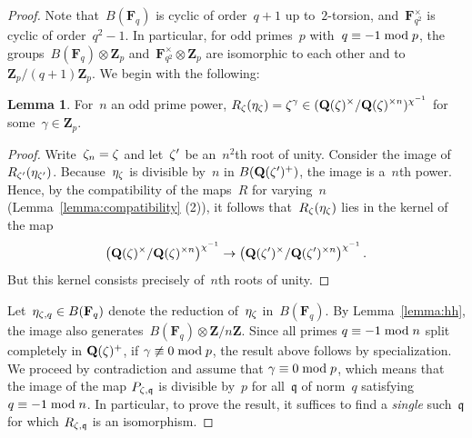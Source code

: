 \documentclass[12pt,reqno]{amsart}
\theoremstyle{definition}
\newtheorem{lemma}[theorem]{Lemma}
\newcommand{\changed}[1]{{#1}}
\def\mod{\;\text{\rm mod}\;}
\def\Q{\mathbf Q}   %
\def\Z{\mathbf Z}   %
\def\F{\mathbf F}   %
\def\ii{i}
\def\red{\color{red}}
\def\nn{n}
\def\q{\mathfrak{q}}
\begin{document}
\begin{proof} 
Note that~$B(\F_q)$ is cyclic of order~$q+1$ up to~$2$-torsion,
and~$\F^{\times}_{q^2}$ is cyclic of order~$q^2 -1$. In particular, 
for odd primes~$p$ with~$q \equiv -1 \mod p$, the 
groups~$B(\F_q) \otimes \Z_p$ and~$ \F^{\times}_{q^2} \otimes \Z_p$ are 
isomorphic to each other and to~$\Z_p/(q+1)\Z_p$.
We begin with the following:
 
\begin{lemma} \label{invertible} \changed{For~$\nn$ an odd prime power}, 
$\displaystyle{R_\z(\eta_\z) 
= \z^\gamma \in (\Q(\z)^{\times}/\Q(\z)^{\times \nn})^{\chi^{-1}}}$
for some~$\gamma \in \Z_p$. 
\end{lemma}
 
\begin{proof} 
Write~$\z_{\nn} = \z$ and let~$\zeta'$ be an~$n^2$th root of unity.
Consider the image of $R_{\zeta'}(\eta_{\zeta'})$. 
Because~$\eta_\zeta$ is divisible by~$\nn$ in $B(\Q(\z')^{+})$, the image
is a~$\nn$th  power. Hence, by the compatibility of the maps~$R$ for 
varying~$\nn$ (Lemma~\ref{lemma:compatibility} (2)),
it follows that~$R_\zeta(\eta_\zeta)$ lies in the kernel of the map
$$
\left(\Q(\z)^{\times}/\Q(\z)^{\times \nn}\right)^{\chi^{-1}}
\rightarrow 
\left(\Q(\z')^{\times}/\Q(\z')^{\times \nn}\right)^{\chi^{-1}}.
$$
But this kernel consists precisely of~$\nn$th roots of unity.
\end{proof}
 
Let~$\eta_{\z,q} \in B(\F_q)$ denote the reduction of~$\eta_\zeta$ in~$B(\F_q)$.
By Lemma~\ref{lemma:hh}, the image also 
generates~$B(\F_q) \otimes \Z/\nn \Z$.
Since all primes $q \equiv -1 \mod \nn$ split 
completely in $\Q(\z)^{+}$,
if $\gamma \not\equiv 0 \mod p$, the result above follows by specialization. 
We proceed by contradiction and assume that $\gamma \equiv 0 \mod p$,
which means that the image of the map $P_{\z,\q}$ is divisible
by~$p$ for all~$\q$ of norm~$q$ satisfying $q \equiv -1 \mod \nn$. In 
particular, to prove the result, it suffices to find a \emph{single} 
such~$\q$ for which $R_{\z,\q}$ is an isomorphism.
 

\end{proof}
\end{document}
